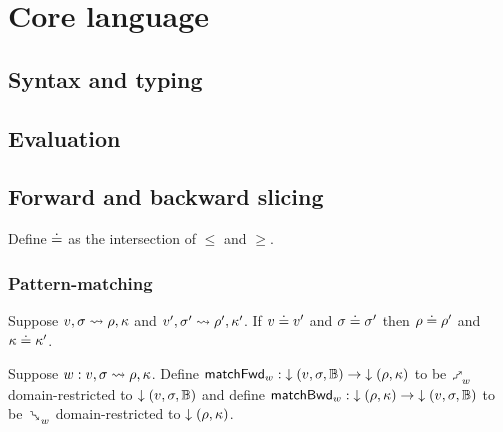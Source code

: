 \section{Core language}

\subsection{Syntax and typing}







\subsection{Evaluation}



\subsection{Forward and backward slicing}



\begin{definition}
   Define $\doteq$ as the intersection of $\leq$ and $\geq$.
\end{definition}




\subsubsection{Pattern-matching}




\begin{lemma}
   Suppose $v, \sigma \rightsquigarrow \rho, \kappa$ and $v', \sigma' \rightsquigarrow \rho', \kappa'$. If $v \doteq v'$ and $\sigma \doteq \sigma'$ then $\rho \doteq \rho'$ and $\kappa \doteq \kappa'$.
\end{lemma}

\begin{definition}
   Suppose $w: v, \sigma \rightsquigarrow \rho, \kappa$. Define $\mathsf{matchFwd}_{w}: {\downarrow{(v,\sigma,\mathbb{B})}} \to {\downarrow{(\rho,\kappa)}}$ to be $\matchFwdR{w}$ domain-restricted to ${\downarrow{(v,\sigma,\mathbb{B})}}$ and define $\mathsf{matchBwd}_{w}: {\downarrow{(\rho,\kappa)}} \to {\downarrow{(v,\sigma,\mathbb{B})}}$ to be $\matchBwdR{w}$ domain-restricted to ${\downarrow{(\rho,\kappa)}}$.
\end{definition}

